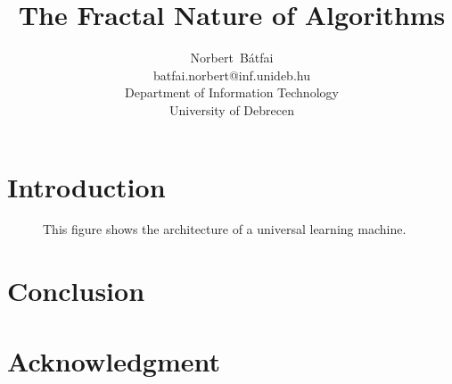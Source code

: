 \documentclass[a4paper]{article}
\begin{document}
\title{The Fractal Nature of Algorithms}
\author{Norbert~B\'atfai\\batfai.norbert@inf.unideb.hu\\Department of Information Technology\\University of Debrecen}

\maketitle

\begin{abstract}

\end{abstract}

\section{Introduction}

\cite{Turing}
\cite{Neumann}
\cite{TheorRobopsy}
\cite{WhatIsLife}

\begin{figure}[!h]
\centering
\scalebox{1}{}
\caption{This figure shows the architecture of a universal learning machine.\label{fig_ULM}}
\end{figure}

\section{Conclusion}

\section{Acknowledgment}


\end{document}
